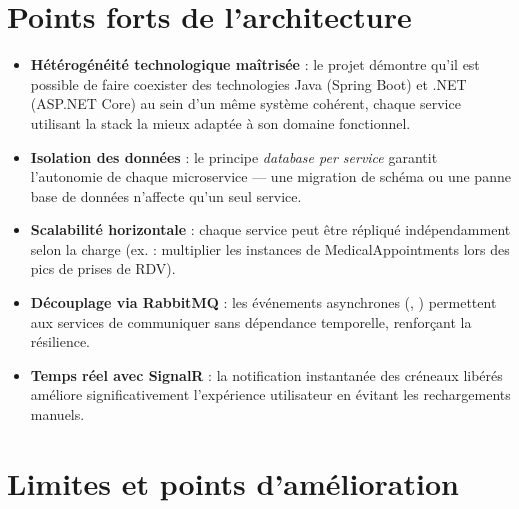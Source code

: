 \section{Points forts de l'architecture}

\begin{itemize}[itemsep=6pt]
  \item \textbf{Hétérogénéité technologique maîtrisée} : le projet démontre qu'il
    est possible de faire coexister des technologies Java (Spring Boot) et .NET
    (ASP.NET Core) au sein d'un même système cohérent, chaque service utilisant
    la stack la mieux adaptée à son domaine fonctionnel.

  \item \textbf{Isolation des données} : le principe \textit{database per service}
    garantit l'autonomie de chaque microservice — une migration de schéma ou une
    panne base de données n'affecte qu'un seul service.

  \item \textbf{Scalabilité horizontale} : chaque service peut être répliqué
    indépendamment selon la charge (ex. : multiplier les instances de
    MedicalAppointments lors des pics de prises de RDV).

  \item \textbf{Découplage via RabbitMQ} : les événements asynchrones
    (, ) permettent aux services
    de communiquer sans dépendance temporelle, renforçant la résilience.

  \item \textbf{Temps réel avec SignalR} : la notification instantanée des créneaux
    libérés améliore significativement l'expérience utilisateur en évitant les
    rechargements manuels.
\end{itemize}

\section{Limites et points d'amélioration}

